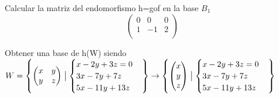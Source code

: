 \documentclass[11pt]{article}
\begin{document}
\begin{question}
\begin{subquestion}{Calcular la matriz del endomorfismo h=gof en la base $B_{1}$}
{\begin{equation*}
{\begin{pmatrix}
                    0  &   0   &   0\\
                    1  &   -1   &   2\\
                \end{pmatrix}
            }
        \end{equation*}
    }
    \end{subquestion}
    \begin{subquestion}{Obtener una base de h(W) 
    \newline
    siendo $W=\left\lbrace\begin{pmatrix} x & y\\ y & z\end{pmatrix}\bigm\vert
        \begin{cases}
          x-2y+3z=0\\
          3x-7y+7z\\
          5x-11y+1 3z
        \end{cases}\right\rbrace \to \left\lbrace\begin{pmatrix} x\\ y\\ z\end{pmatrix}\bigm\vert
        \begin{cases}
          x-2y+3z=0\\
          3x-7y+7z\\
          5x-11y+1 3z
        \end{cases}\right\rbrace$
    }
\end{subquestion}
\end{question}
\end{document}
